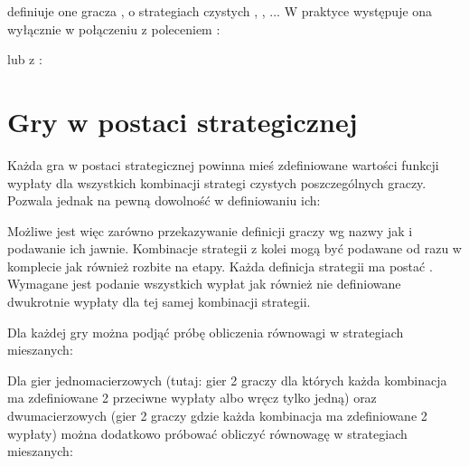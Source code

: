 \documentclass{standalone}
\begin{document}
definiuje one gracza , o strategiach czystych , ,
... W praktyce występuje ona wyłącznie w połączeniu z poleceniem :


lub z :


\section{Gry w postaci strategicznej}

Każda gra w postaci strategicznej powinna mieś zdefiniowane wartości funkcji wypłaty dla wszystkich kombinacji strategi czystych poszczególnych
graczy. Pozwala jednak na pewną dowolność w definiowaniu ich:


Możliwe jest więc zarówno przekazywanie definicji graczy wg nazwy jak i podawanie ich jawnie. Kombinacje strategii z kolei mogą być podawane
od razu w komplecie jak również rozbite na etapy. Każda definicja strategii ma postać . Wymagane jest podanie wszystkich wypłat jak również nie definiowane dwukrotnie wypłaty dla tej samej kombinacji strategii.

Dla każdej gry można podjąć próbę obliczenia równowagi w strategiach mieszanych:


Dla gier jednomacierzowych (tutaj: gier 2 graczy dla których każda kombinacja ma zdefiniowane 2 przeciwne wypłaty albo wręcz tylko jedną) oraz
dwumacierzowych (gier 2 graczy gdzie każda kombinacja ma zdefiniowane 2 wypłaty) można dodatkowo próbować obliczyć równowagę w strategiach mieszanych:

\end{document}
